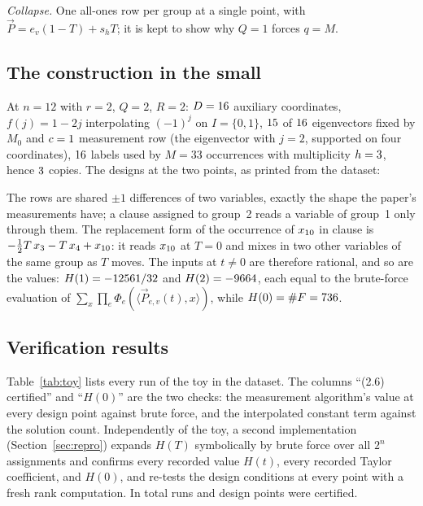 \documentclass[11pt]{article}
\theoremstyle{definition}
\theoremstyle{remark}
\newcommand{\Phie}{\Phi_e}
\newcommand{\cnt}{\#F}
\newcommand{\angles}[1]{\langle #1 \rangle}
\begin{document}
\emph{Collapse.} One all-ones row per group at a single point, with $\vec P = e_v(1-T) + s_h T$; it is kept to show why $Q = 1$ forces $q = M$.

\subsection{The construction in the small}\label{sec:auxexample}

At $n = 12$ with $r = 2$, $Q = 2$, $R = 2$: $D = 16$ auxiliary coordinates, $f(j) = 1 - 2j$ interpolating $(-1)^j$ on $I = \{0, 1\}$, $15$ of $16$ eigenvectors fixed by $M_0$ and $c = 1$ measurement row (the eigenvector with $j = 2$, supported on four coordinates), $16$ labels used by $M = 33$ occurrences with multiplicity $h = 3$, hence $3$ copies. The designs at the two points, as printed from the dataset:

{\small}

The rows are shared $\pm 1$ differences of two variables, exactly the shape the paper's measurements have; a clause assigned to group~2 reads a variable of group~1 only through them. The replacement form of the occurrence of $x_{10}$ in clause \auxTwelveExampleClause{} is $-\tfrac{1}{2}T\,x_{3} - T\,x_{4} + x_{10}$: it reads $x_{10}$ at $T = 0$ and mixes in two other variables of the same group as $T$ moves. The inputs at $t \ne 0$ are therefore rational, and so are the values: $H(1) = -12561/32$ and $H(2) = -9664$, each equal to the brute-force evaluation of $\sum_x \prod_e \Phie(\angles{\vec P_{e,v}(t), x})$, while $H(0) = \cnt = \auxTwelveCount$.

\subsection{Verification results}

Table~\ref{tab:toy} lists every run of the toy in the dataset. The columns ``(2.6) certified'' and ``$H(0)$'' are the two checks: the measurement algorithm's value at every design point against brute force, and the interpolated constant term against the solution count. Independently of the toy, a second implementation (Section~\ref{sec:repro}) expands $H(T)$ symbolically by brute force over all $2^n$ assignments and confirms every recorded value $H(t)$, every recorded Taylor coefficient, and $H(0)$, and re-tests the design conditions at every point with a fresh rank computation. In total \toyRunsCount{} runs and \toyPointsCertified{} design points were certified.
\end{document}
